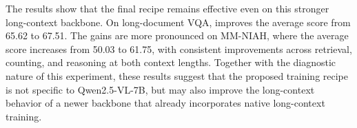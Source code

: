 {{{{The results show that the final \modelname recipe remains effective even on this stronger long-context backbone.
On long-document VQA, \modelname improves the average score from 65.62 to 67.51.
The gains are more pronounced on MM-NIAH, where the average score increases from 50.03 to 61.75, with consistent improvements across retrieval, counting, and reasoning at both context lengths.
Together with the diagnostic nature of this experiment, these results suggest that the proposed training recipe is not specific to Qwen2.5-VL-7B, but may also improve the long-context behavior of a newer backbone that already incorporates native long-context training.

\begin{table}[t]
 \centering
 \caption{MM-NIAH transfer across backbone models. We report Retrieval, Counting, Reasoning, and average scores at 64K and 128K context lengths. Our recipe achieves better overall MM-NIAH score on Qwen3-VL-8B.}
 \label{tab:qwen3_backbone_mmniah}
 \setlength{\tabcolsep}{3.5pt}
\end{table}

}}}}
